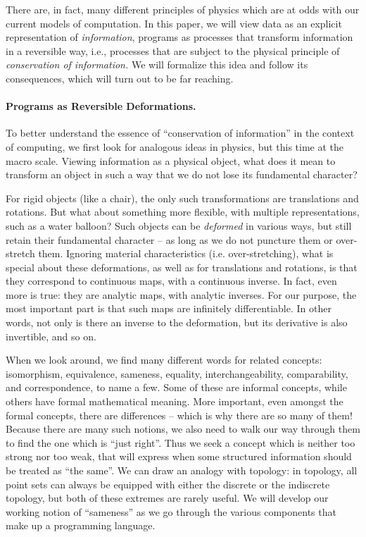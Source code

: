 \documentclass{article}
\begin{document}
There are, in fact, many different principles of physics which are at
odds with our current models of computation. In this paper, we will
view data as an explicit representation of \emph{information},
programs as processes that transform information in a reversible way,
i.e., processes that are subject to the physical principle of
\emph{conservation of information.} We will formalize this idea and
follow its consequences, which will turn out to be far reaching.

\paragraph*{Programs as Reversible Deformations.} 

To better understand the essence of ``conservation of information'' in
the context of computing, we first look for analogous ideas in
physics, but this time at the macro scale. Viewing information as a
physical object, what does it mean to transform an object in such a
way that we do not lose its fundamental character?

For rigid objects (like a chair), the only such transformations are
translations and rotations. But what about something more flexible,
with multiple representations, such as a water balloon?  Such objects
can be \emph{deformed} in various ways, but still retain their
fundamental character -- as long as we do not puncture them or
over-stretch them. Ignoring material characteristics
(i.e. over-stretching), what is special about these deformations, as
well as for translations and rotations, is that they correspond to
continuous maps, with a continuous inverse. In fact, even more is
true: they are analytic maps, with analytic inverses. For our purpose,
the most important part is that such maps are infinitely
differentiable.  In other words, not only is there an inverse to the
deformation, but its derivative is also invertible, and so on.

When we look around, we find many different words for related
concepts: isomorphism, equivalence, sameness, equality,
interchangeability, comparability, and correspondence, to name a
few. Some of these are informal concepts, while others have formal
mathematical meaning.  More important, even amongst the formal
concepts, there are differences -- which is why there are so many of
them! Because there are many such notions, we also need to walk our
way through them to find the one which is ``just right''. Thus we seek
a concept which is neither too strong nor too weak, that will express
when some structured information should be treated as ``the same''.
We can draw an analogy with topology: in topology, all point sets can
always be equipped with either the discrete or the indiscrete
topology, but both of these extremes are rarely useful. We will
develop our working notion of ``sameness'' as we go through the
various components that make up a programming language.
\end{document}
